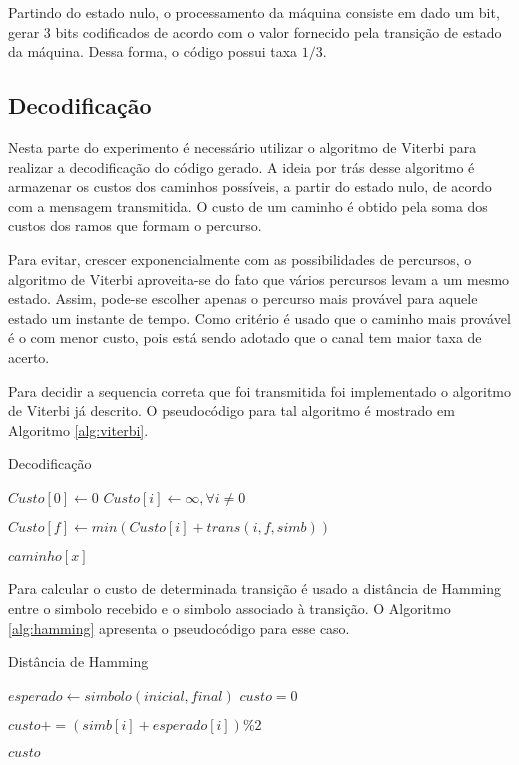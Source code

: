 Partindo do estado nulo, o processamento da máquina consiste em dado um bit, gerar 3 bits codificados de acordo com o valor fornecido pela transição de estado da máquina. Dessa forma, o código possui taxa $1/3$.


\subsection{Decodificação}

Nesta parte do experimento é necessário utilizar o algoritmo de Viterbi para realizar a decodificação do código gerado. A ideia por trás desse algoritmo é armazenar os custos dos caminhos possíveis, a partir do estado nulo, de acordo com a mensagem transmitida. O custo de um caminho é obtido pela soma dos custos dos ramos que formam o percurso.

Para evitar, crescer exponencialmente com as possibilidades de percursos, o algoritmo de Viterbi aproveita-se do fato que vários percursos levam a um mesmo estado. Assim, pode-se escolher apenas o percurso mais provável para aquele estado um instante de tempo. Como critério é usado que o caminho mais provável é o com menor custo, pois está sendo adotado que o canal tem maior taxa de acerto.

Para decidir a sequencia correta que foi transmitida foi implementado o algoritmo de Viterbi já descrito. O pseudocódigo para tal algoritmo é mostrado em Algoritmo \ref{alg:viterbi}.

\begin{algorithm}[h!]
	\caption{Decodificação}
	\label{alg:viterbi}
	\begin{algorithmic}		
			\State $Custo[0] \gets 0$
			\State $Custo[i] \gets \infty, \forall i \ne 0$
			
					\State $Custo[f] \gets min(Custo[i] + trans(i, f, simb))$
				\EndFor
			\EndFor
			
			
		\Return $caminho[x]$
		\EndProcedure
	\end{algorithmic}
\end{algorithm}

\newpage
Para calcular o custo de determinada transição é usado a distância de Hamming entre o simbolo recebido e o simbolo associado à transição. O Algoritmo \ref{alg:hamming} apresenta o pseudocódigo para esse caso.

\begin{algorithm}[h!]
	\caption{Distância de Hamming}
	\label{alg:hamming}
	\begin{algorithmic}		
		\State $esperado \gets simbolo(inicial, final)$
		\State $custo = 0$
		
			\State $custo += (simb[i] + esperado[i]) \% 2$
		\EndFor
		
		\Return $custo$
		\EndProcedure
	\end{algorithmic}
\end{algorithm}

